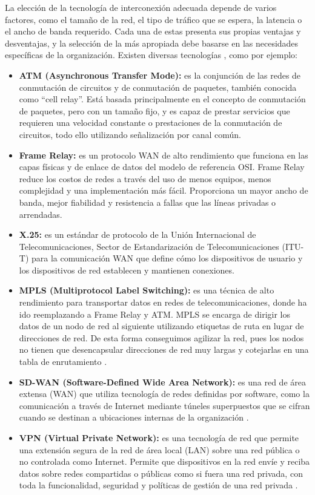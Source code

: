 \vspace{0.5cm}
La elección de la tecnología de interconexión adecuada depende de varios factores, como el tamaño de la red, el tipo de tráfico que se espera, la latencia o el ancho de banda requerido. Cada una de estas presenta sus propias ventajas y desventajas, y la selección de la más apropiada debe basarse en las necesidades específicas de la organización. Existen diversas tecnologías \cite{conexion_redes_extendidas}, como por ejemplo:
\begin{itemize}
  \item \textbf{ATM (Asynchronous Transfer Mode):} es la conjunción de las redes de conmutación de circuitos y de conmutación de paquetes, también conocida como ``cell relay''. Está basada principalmente en el concepto de conmutación de paquetes, pero con un tamaño fijo, y es capaz de prestar servicios que requieren una velocidad constante o prestaciones de la conmutación de circuitos, todo ello utilizando señalización por canal común.
  \item \textbf{Frame Relay:} es un protocolo WAN de alto rendimiento que funciona en las capas físicas y de enlace de datos del modelo de referencia OSI. Frame Relay reduce los costos de redes a través del uso de menos equipos, menos complejidad y una implementación más fácil. Proporciona un mayor ancho de banda, mejor fiabilidad y resistencia a fallas que las líneas privadas o arrendadas.
  \item \textbf{X.25:} es un estándar de protocolo de la Unión Internacional de Telecomunicaciones, Sector de Estandarización de Telecomunicaciones (ITU-T) para la comunicación WAN que define cómo los dispositivos de usuario y los dispositivos de red establecen y mantienen conexiones.
  \item \textbf{MPLS (Multiprotocol Label Switching):} es una técnica de alto rendimiento para transportar datos en redes de telecomunicaciones, donde ha ido reemplazando a Frame Relay y ATM. MPLS se encarga de dirigir los datos de un nodo de red al siguiente utilizando etiquetas de ruta en lugar de direcciones de red. De esta forma conseguimos agilizar la red, pues los nodos no tienen que desencapsular direcciones de red muy largas y cotejarlas en una tabla de enrutamiento \cite{mpls_elements}.  
  \item \textbf{SD-WAN (Software-Defined Wide Area Network):} es una red de área extensa (WAN) que utiliza tecnología de redes definidas por software, como la comunicación a través de Internet mediante túneles superpuestos que se cifran cuando se destinan a ubicaciones internas de la organización \cite{wikipedia_sdwan}.
  \item \textbf{VPN (Virtual Private Network):} es una tecnología de red que permite una extensión segura de la red de área local (LAN) sobre una red pública o no controlada como Internet. Permite que dispositivos en la red envíe y reciba datos sobre redes compartidas o públicas como si fuera una red privada, con toda la funcionalidad, seguridad y políticas de gestión de una red privada \cite{wikipedia_vpn}.
\end{itemize}

